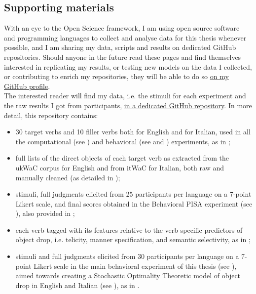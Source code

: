 \subsection{Supporting materials} %
With an eye to the Open Science framework, I am using open source software and programming languages to collect and analyse data for this thesis whenever possible, and I am sharing my data, scripts and results on dedicated GitHub repositories. Should anyone in the future read these pages and find themselves interested in replicating my results, or testing new models on the data I collected, or contributing to enrich my repositories, they will be able to do so \href{https://github.com/giuliacappelli}{on my GitHub profile}.\\ %
The interested reader will find my data, i.e. the stimuli for each experiment and the raw results I got from participants, \href{https://github.com/giuliacappelli/dissertationData}{in a dedicated GitHub repository}. In more detail, this repository contains:
\begin{itemize}
    \item 30 target verbs and 10 filler verbs both for English and for Italian, used in all the computational (see ) and behavioral (see  and ) experiments, as in ;
    \item full lists of the direct objects of each target verb as extracted from the ukWaC corpus for English and from itWaC for Italian, both raw and manually cleaned (as detailed in );
    \item stimuli, full judgments elicited from 25 participants per language on a 7-point Likert scale, and final scores obtained in the Behavioral PISA experiment (see ), also provided in ;
    \item each verb tagged with its features relative to the verb-specific predictors of object drop, i.e. telicity, manner specification, and semantic selectivity, as in ;
    \item stimuli and full judgments elicited from 30 participants per language on a 7-point Likert scale in the main behavioral experiment of this thesis (see ), aimed towards creating a Stochastic Optimality Theoretic model of object drop in English and Italian (see ), as in .
\end{itemize}
